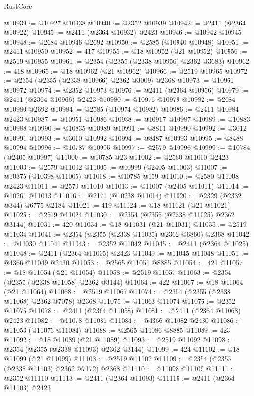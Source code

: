 \begin{lexlean}{RustCore}
\begin{coremodule}
@10939 := @10927 @10938
@10940 := @2352 @10939
@10942 := @2411 (@2364 @10922)
@10945 := @2411 (@2364 @10932) @2423
@10946 := @10942 @10945
@10948 := @2684 @10946 @2692
@10950 := @2585 (@10940 @10948)
@10951 := @2411 @10950
@10952 := 417
@10955 := @18 @10952 (@21 @10952)
@10956 := @2519 @10955
@10961 := @2354 (@2355 (@2338 @10956) @2362 @3683)
@10962 := 418
@10965 := @18 @10962 (@21 @10962)
@10966 := @2519 @10965
@10972 := @2354 (@2355 (@2338 @10966) @2362 @3009) @2368
@10973 := @10961 @10972
@10974 := @2352 @10973
@10976 := @2411 (@2364 @10956)
@10979 := @2411 (@2364 @10966) @2423
@10980 := @10976 @10979
@10982 := @2684 @10980 @2692
@10984 := @2585 (@10974 @10982)
@10986 := @2411 @10984 @2423
@10987 := @10951 @10986
@10988 := @10917 @10987
@10989 := @10883 @10988
@10990 := @10835 @10989
@10991 := @8811 @10990
@10992 := @3012 @10991
@10993 := @3010 @10992
@10994 := @8487 @10993
@10995 := @8488 @10994
@10996 := @10787 @10995
@10997 := @2579 @10996
@10999 := @10784 (@2405 @10997)
@11000 := @10785 @23
@11002 := @2580 @11000 @2423
@11003 := @2579 @11002
@11005 := @10999 (@2405 @11003)
@11007 := @10375 (@10398 @11005)
@11008 := @10785 @159
@11010 := @2580 @11008 @2423
@11011 := @2579 @11010
@11013 := @11007 (@2405 @11011)
@11014 := @10261 @11013
@11016 := @2171 (@10238 @11014)
@11020 := @2329 (@2332 @344) @6775 @2184
@11021 := 419
@11024 := @18 @11021 (@21 @11021)
@11025 := @2519 @11024
@11030 := @2354 (@2355 (@2338 @11025) @2362 @3144)
@11031 := 420
@11034 := @18 @11031 (@21 @11031)
@11035 := @2519 @11034
@11041 := @2354 (@2355 (@2338 @11035) @2362 @6860) @2368
@11042 := @11030 @11041
@11043 := @2352 @11042
@11045 := @2411 (@2364 @11025)
@11048 := @2411 (@2364 @11035) @2423
@11049 := @11045 @11048
@11051 := @4366 @11049 @2430
@11053 := @2565 @11051 @8885
@11054 := 421
@11057 := @18 @11054 (@21 @11054)
@11058 := @2519 @11057
@11063 := @2354 (@2355 (@2338 @11058) @2362 @3144)
@11064 := 422
@11067 := @18 @11064 (@21 @11064)
@11068 := @2519 @11067
@11074 := @2354 (@2355 (@2338 @11068) @2362 @7078) @2368
@11075 := @11063 @11074
@11076 := @2352 @11075
@11078 := @2411 (@2364 @11058)
@11081 := @2411 (@2364 @11068) @2423
@11082 := @11078 @11081
@11084 := @4366 @11082 @2430
@11086 := @11053 (@11076 @11084)
@11088 := @2565 @11086 @8885
@11089 := 423
@11092 := @18 @11089 (@21 @11089)
@11093 := @2519 @11092
@11098 := @2354 (@2355 (@2338 @11093) @2362 @3144)
@11099 := 424
@11102 := @18 @11099 (@21 @11099)
@11103 := @2519 @11102
@11109 := @2354 (@2355 (@2338 @11103) @2362 @7172) @2368
@11110 := @11098 @11109
@11111 := @2352 @11110
@11113 := @2411 (@2364 @11093)
@11116 := @2411 (@2364 @11103) @2423

\end{coremodule}
\end{lexlean}
